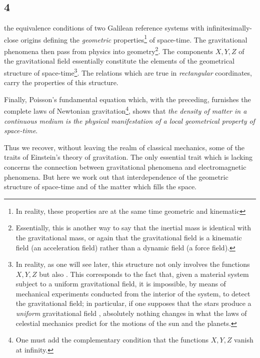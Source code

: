 \subsection*{4}
 the equivalence conditions of two Galilean reference systems with infinitesimally-close origins defining the \textit{geometric} properties\footnote{In reality, these properties are at the same time geometric and kinematic} of space-time. The gravitational phenomena then pass from physics into geometry\footnote{Essentially, this is another way to say that the inertial mass is identical with the gravitational mass, or again that the gravitational field is a kinematic field (an acceleration field) rather than a dynamic field (a force field).}. The components $X,Y,Z$ of the gravitational field essentially constitute the elements of the geometrical structure of space-time\footnote{In reality, as one will see later, this structure not only involves the functions $X,Y,Z$ but also . This corresponds to the fact that, given a material system subject to a uniform gravitational field, it is impossible, by means of mechanical experiments conducted from the interior of the system, to detect the gravitational field; in particular, if one supposes that the stars produce a \textit{uniform} gravitational field , absolutely nothing changes in what the laws of celestial mechanics predict for the motions of the sun and the planets.}. The relations
which are true in \textit{rectangular} coordinates, carry the properties of this structure.

Finally, Poisson's fundamental equation
which, with the preceding, furnishes the complete laws of Newtonian gravitation\footnote{One must add the complementary condition that the functions $X,Y,Z$ vanish at infinity.}, shows that \textit{the density of matter in a continuous medium is the physical manifestation of a local geometrical property of space-time}.

Thus we recover, without leaving the realm of classical mechanics, some of the traits of Einstein's theory of gravitation. The only essential trait which is lacking concerns the connection between gravitational phenomena and electromagnetic phenomena. But here we work out that interdependence of the geometric structure of space-time and of the matter which fills the space.
